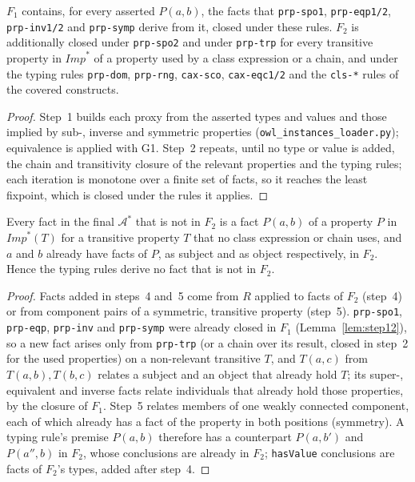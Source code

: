 \begin{lemma}
\label{lem:step12}
$F_1$ contains, for every asserted $P(a,b)$, the facts that \texttt{prp-spo1}, \texttt{prp-eqp1/2},
\texttt{prp-inv1/2} and \texttt{prp-symp} derive from it, closed under these rules. $F_2$ is
additionally closed under \texttt{prp-spo2} and under \texttt{prp-trp} for every transitive
property in $\mathit{Imp}^*$ of a property used by a class expression or a chain, and under the
typing rules \texttt{prp-dom}, \texttt{prp-rng}, \texttt{cax-sco}, \texttt{cax-eqc1/2} and the
\texttt{cls-*} rules of the covered constructs.
\end{lemma}

\begin{proof}
Step~1 builds each proxy from the asserted types and values and those implied by sub-, inverse
and symmetric properties (\texttt{owl\_instances\_loader.py}); equivalence is applied with G1.
Step~2 repeats, until no type or value is added, the chain and transitivity closure of the
relevant properties and the typing rules; each iteration is monotone over a finite set of
facts, so it reaches the least fixpoint, which is closed under the rules it applies.
\end{proof}

\begin{lemma}
\label{lem:typing}
Every fact in the final $\mathcal{A}^*$ that is not in $F_2$ is a fact $P(a,b)$ of a property $P$
in $\mathit{Imp}^*(T)$ for a transitive property $T$ that no class expression or chain uses, and
$a$ and $b$ already have facts of $P$, as subject and as object respectively, in $F_2$. Hence the
typing rules derive no fact that is not in $F_2$.
\end{lemma}

\begin{proof}
Facts added in steps~4 and~5 come from $R$ applied to facts of $F_2$ (step~4) or from component
pairs of a symmetric, transitive property (step~5). \texttt{prp-spo1}, \texttt{prp-eqp},
\texttt{prp-inv} and \texttt{prp-symp} were already closed in $F_1$ (Lemma~\ref{lem:step12}),
so a new fact arises only from \texttt{prp-trp} (or a chain over its result, closed in step~2 for
the used properties) on a non-relevant transitive $T$, and $T(a,c)$ from $T(a,b),T(b,c)$ relates
a subject and an object that already hold $T$; its super-, equivalent and inverse facts relate
individuals that already hold those properties, by the closure of $F_1$. Step~5 relates members
of one weakly connected component, each of which already has a fact of the property in both
positions (symmetry). A typing rule's premise $P(a,b)$ therefore has a counterpart $P(a,b')$ and
$P(a'',b)$ in $F_2$, whose conclusions are already in $F_2$; \texttt{hasValue} conclusions are
facts of $F_2$'s types, added after step~4.
\end{proof}

